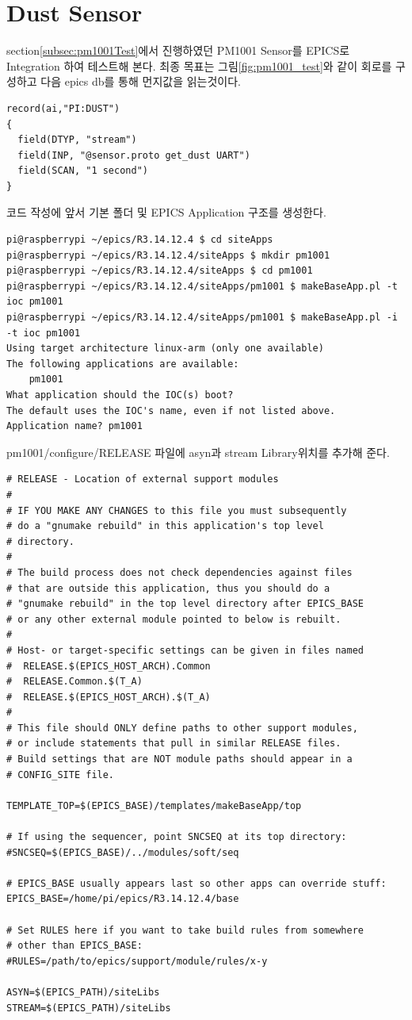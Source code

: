 \documentclass[11pt
  , a4paper
  , article
  , oneside
]{memoir}
\begin{document}
\section{Dust Sensor}
section\ref{subsec:pm1001Test}에서 진행하였던 PM1001 Sensor를 EPICS로 Integration 하여 테스트해 본다.
최종 목표는 그림\ref{fig:pm1001_test}와 같이 회로를 구성하고 다음 epics db를 통해 먼지값을 읽는것이다.
\begin{lstlisting}[style=termstyle]
record(ai,"PI:DUST")
{
  field(DTYP, "stream")
  field(INP, "@sensor.proto get_dust UART")
  field(SCAN, "1 second")
}
\end{lstlisting}
코드 작성에 앞서 기본 폴더 및 EPICS Application 구조를 생성한다.
\begin{lstlisting}[style=termstyle]
pi@raspberrypi ~/epics/R3.14.12.4 $ cd siteApps
pi@raspberrypi ~/epics/R3.14.12.4/siteApps $ mkdir pm1001
pi@raspberrypi ~/epics/R3.14.12.4/siteApps $ cd pm1001
pi@raspberrypi ~/epics/R3.14.12.4/siteApps/pm1001 $ makeBaseApp.pl -t ioc pm1001
pi@raspberrypi ~/epics/R3.14.12.4/siteApps/pm1001 $ makeBaseApp.pl -i -t ioc pm1001
Using target architecture linux-arm (only one available)
The following applications are available:
    pm1001
What application should the IOC(s) boot?
The default uses the IOC's name, even if not listed above.
Application name? pm1001
\end{lstlisting}
pm1001/configure/RELEASE 파일에 asyn과 stream Library위치를 추가해 준다.
\begin{lstlisting}[style=termstyle]
# RELEASE - Location of external support modules
#
# IF YOU MAKE ANY CHANGES to this file you must subsequently
# do a "gnumake rebuild" in this application's top level
# directory.
#
# The build process does not check dependencies against files
# that are outside this application, thus you should do a
# "gnumake rebuild" in the top level directory after EPICS_BASE
# or any other external module pointed to below is rebuilt.
#
# Host- or target-specific settings can be given in files named
#  RELEASE.$(EPICS_HOST_ARCH).Common
#  RELEASE.Common.$(T_A)
#  RELEASE.$(EPICS_HOST_ARCH).$(T_A)
#
# This file should ONLY define paths to other support modules,
# or include statements that pull in similar RELEASE files.
# Build settings that are NOT module paths should appear in a
# CONFIG_SITE file.

TEMPLATE_TOP=$(EPICS_BASE)/templates/makeBaseApp/top

# If using the sequencer, point SNCSEQ at its top directory:
#SNCSEQ=$(EPICS_BASE)/../modules/soft/seq

# EPICS_BASE usually appears last so other apps can override stuff:
EPICS_BASE=/home/pi/epics/R3.14.12.4/base

# Set RULES here if you want to take build rules from somewhere
# other than EPICS_BASE:
#RULES=/path/to/epics/support/module/rules/x-y

ASYN=$(EPICS_PATH)/siteLibs
STREAM=$(EPICS_PATH)/siteLibs
\end{lstlisting}
\end{document}
